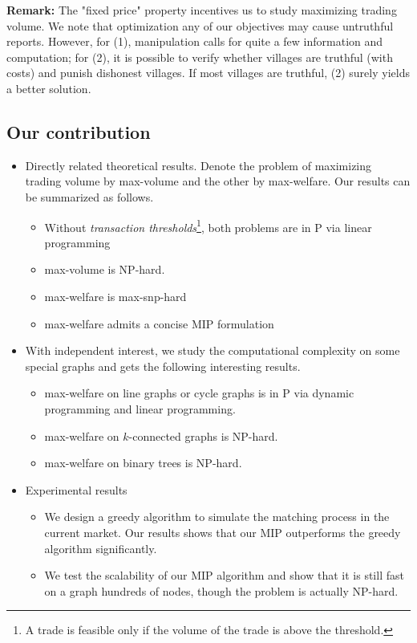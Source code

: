 \documentclass{aamas2015}
\begin{document}
\textbf{Remark:} The "fixed price" property incentives us to study maximizing trading volume. We note that optimization any of our objectives may cause untruthful reports. However, for (1), manipulation calls for quite a few information and computation; for (2), it is possible to verify whether villages are truthful (with costs) and punish dishonest villages. If most villages are truthful, (2) surely yields a better solution. 

\subsection{Our contribution}
\begin{itemize}
	\item Directly related theoretical results. Denote the problem of maximizing trading volume by {\sc max-volume} and the other by {\sc max-welfare}. Our results can be summarized as follows.
	\begin{itemize}
		\item Without \textit{transaction thresholds}\footnote{A trade is feasible only if the volume of the trade is above the threshold.}, both problems are in P via linear programming
		\item {\sc max-volume} is {\sc NP-hard}.
		\item {\sc max-welfare} is  {\sc max-snp-hard}
		\item {\sc max-welfare} admits a concise MIP formulation
	\end{itemize}
	\item With independent interest, we study the computational complexity on some special graphs and gets the following interesting results.
	\begin{itemize}
		\item {\sc max-welfare} on line graphs or cycle graphs is in P via dynamic programming and linear programming.
		\item {\sc max-welfare} on $k$-connected graphs is {\sc NP-hard}.
		\item{\sc max-welfare} on binary trees is {\sc NP-hard}.
	\end{itemize}
	\item Experimental results
	\begin{itemize}
		\item We design a greedy algorithm to simulate the matching process in the current market. Our results shows that our MIP outperforms the greedy algorithm significantly.
		\item We test the scalability of our MIP algorithm and show that it is still fast on a graph hundreds of nodes, though the problem is actually {\sc NP-hard}.
	\end{itemize}
\end{itemize}
\end{document}
